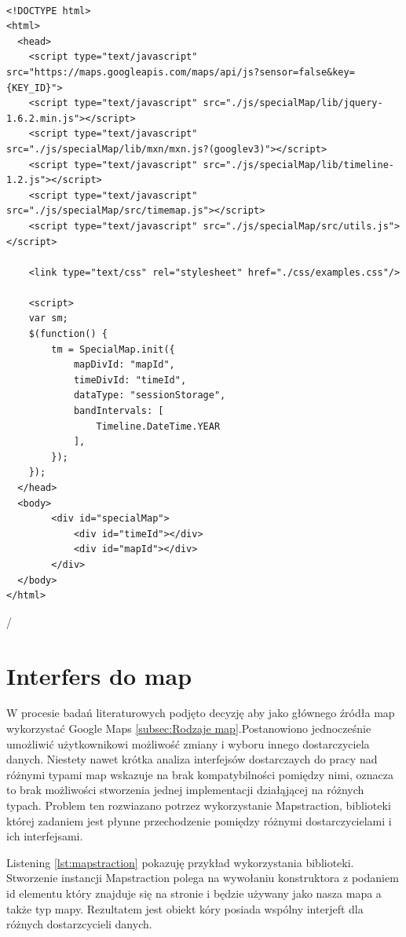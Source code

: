\lstset{language=JavaScript}
\begin{lstlisting}[label={lst:minconf},caption={Minimalna konfiguracja.}]

<!DOCTYPE html>
<html>
  <head>
    <script type="text/javascript" src="https://maps.googleapis.com/maps/api/js?sensor=false&key={KEY_ID}">
    <script type="text/javascript" src="./js/specialMap/lib/jquery-1.6.2.min.js"></script>
    <script type="text/javascript" src="./js/specialMap/lib/mxn/mxn.js?(googlev3)"></script>
    <script type="text/javascript" src="./js/specialMap/lib/timeline-1.2.js"></script>
    <script type="text/javascript" src="./js/specialMap/src/timemap.js"></script>
    <script type="text/javascript" src="./js/specialMap/src/utils.js"></script>

    <link type="text/css" rel="stylesheet" href="./css/examples.css"/>

    <script>
    var sm;
    $(function() {
        tm = SpecialMap.init({
            mapDivId: "mapId",
            timeDivId: "timeId",
            dataType: "sessionStorage",
            bandIntervals: [
	            Timeline.DateTime.YEAR
	        ],
        });
    });
  </head>
  <body>
        <div id="specialMap">
            <div id="timeId"></div>
            <div id="mapId"></div>
        </div>
  </body>
</html>
\end{lstlisting}/


\section{Interfers do map}
\label{sec:mxn}

W procesie badań literaturowych podjęto decyzję aby jako głównego źródła map wykorzystać Google Maps \ref{subsec:Rodzaje map}.Postanowiono jednocześnie umożliwić użytkownikowi możliwość zmiany i wyboru innego dostarczyciela danych. Niestety nawet krótka analiza interfejsów dostarczaych do pracy nad różnymi typami map wskazuje na brak kompatybilności pomiędzy nimi, oznacza to brak możliwości stworzenia jednej implementacji działąjącej na różnych typach. Problem ten rozwiazano potrzez wykorzystanie Mapstraction, biblioteki której zadaniem jest płynne przechodzenie pomiędzy różnymi dostarczycielami i ich interfejsami.

Listening \ref{lst:mapstraction} pokazuję przykład wykorzystania biblioteki. Stworzenie instancji Mapstraction polega na wywołaniu konstruktora z podaniem id elementu który znajduje się na stronie i będzie używany jako nasza mapa a także typ mapy. Rezultatem jest obiekt kóry posiada wspólny interjeft dla różnych dostarzcycieli danych.

